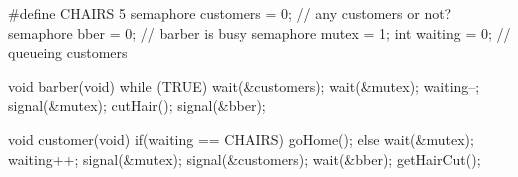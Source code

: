 \documentclass[varwidth=9.8cm,crop]{standalone}
\begin{document}
\begin{ccode}
#define CHAIRS 5
semaphore customers = 0; // any customers or not?
semaphore bber = 0;      // barber is busy
semaphore mutex = 1;
int waiting = 0;         // queueing customers
\end{ccode}
\begin{minipage}[t]{.42\linewidth}
\begin{ccode}
void barber(void)
{
  while (TRUE) {
    wait(&customers);
    wait(&mutex);
       waiting--;
    signal(&mutex);
    cutHair();
    signal(&bber);
  }
}        
\end{ccode}
\end{minipage}\qquad
\begin{minipage}[t]{.48\linewidth}
\begin{ccode}
void customer(void)
{
  if(waiting == CHAIRS)
    goHome();
  else {
    wait(&mutex);
    waiting++;
    signal(&mutex);
    signal(&customers);
    wait(&bber);
    getHairCut();
  }
}      
\end{ccode}
\end{minipage}
\end{document}
